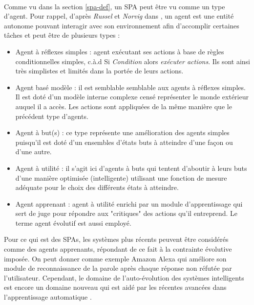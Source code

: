 \paragraph{}
Comme vu dans la section \ref{spa-def}, un SPA peut être vu comme un type d'agent. Pour rappel, d'après \textit{Russel} et \textit{Norvig} dans \citep{RussellAgent}, un agent\label{agent} est une entité autonome pouvant interagir avec son environnement afin d'accomplir certaines tâches et peut être de plusieurs types : 
\begin{itemize}
	\item Agent à réflexes simples : agent exécutant ses actions à base de règles conditionnelles simples, c.à.d Si \textit{Condition } alors \textit{exécuter actions}. Ils sont ainsi très simplistes et limités dans la portée de leurs actions.
	
	\item Agent basé modèle : il est semblable semblable aux agents à réflexes simples. Il est doté d'un modèle interne complexe censé représenter le monde extérieur auquel il a accès. Les actions sont appliquées de la même manière que le précédent type d'agents.
	
	\item Agent à but(s) : ce type représente une amélioration des agents simples puisqu'il est doté d'un ensembles d'états buts à atteindre d'une façon ou d'une autre.
	
	\item Agent à utilité : il s'agit ici d'agents à buts qui tentent d'aboutir à leurs buts d'une manière optimisée (intelligente) utilisant une fonction de mesure adéquate pour le choix des différents états à atteindre.
	
	\item Agent apprenant : agent à utilité enrichi par un module d'apprentissage qui sert de juge pour répondre aux "critiques" des actions qu'il entreprend. Le terme agent évolutif est aussi employé.
\end{itemize}
\par Pour ce qui est des SPAs, les systèmes plus récents peuvent être considérés comme des agents apprenants, répondant de ce fait à la contrainte évolutive imposée. On peut donner comme exemple Amazon Alexa qui améliore son  module de reconnaissance de la parole après chaque réponse non réfutée par l'utilisateur. Cependant, le domaine de l'auto-évolution des systèmes intelligents est encore un domaine nouveau qui est aidé par les récentes avancées dans l'apprentissage automatique \citep{SPA-overview}.


